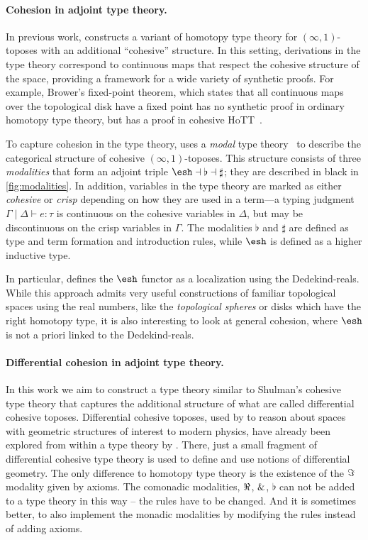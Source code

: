\documentclass{article}
\begin{document}
\paragraph{Cohesion in adjoint type theory.}

In previous work, \citet{Shulman2015} constructs a variant of homotopy type
theory for $(\infty,1)$-toposes with an additional ``cohesive'' structure. In
this setting, derivations in the type theory correspond to continuous maps that
respect the cohesive structure of the space, providing a framework for a wide
variety of synthetic proofs. For example, Brower's fixed-point theorem, which
states that all continuous maps over the topological disk have a fixed point has
no synthetic proof in ordinary homotopy type theory, but has a proof in cohesive
HoTT~\citep{Shulman2015}.


To capture cohesion in the type theory, \citet{Shulman2015} uses a \emph{modal}
type theory~\citep{Pfenning2001} to describe the categorical structure of
cohesive $(\infty,1)$-toposes. This structure consists of three
\emph{modalities}  that form an adjoint triple
$\shape \dashv \flat \dashv \sharp$; they are described in black in
\cref{fig:modalities}. In addition, variables in the type theory are marked as
either \emph{cohesive} or \emph{crisp} depending on how they are used in a
term---a typing judgment $\Gamma \mid \Delta \vdash e : \tau$ is continuous on
the cohesive variables in $\Delta$, but may be discontinuous on the crisp
variables in $\Gamma$. The modalities $\flat$ and $\sharp$ are defined as type
and term formation and introduction rules, while $\shape$ is defined as a higher
inductive type.

In particular, \citeauthor{Shulman2015} defines the $\shape$ functor as a
localization using the Dedekind-reals. While this approach admits very
useful constructions of familiar topological spaces using the real numbers, like
the \emph{topological spheres} or disks which have the right homotopy type, it
is also interesting to look at general cohesion, where $\shape$ is not a priori
linked to the Dedekind-reals.


\paragraph{Differential cohesion in adjoint type theory.}

In this work we aim to construct a type theory similar to Shulman's cohesive
type theory that captures the additional structure of what are called
differential cohesive toposes. Differential cohesive toposes, used by
\citet{Schreiber2013} to reason about spaces with geometric structures of
interest to modern physics, have already been explored from within a type theory
by \citet{Wellen2017}. There, just a small fragment of differential cohesive
type theory is used to define and use notions of differential geometry. The only
difference to homotopy type theory is the existence of the $\Im$ modality
given by axioms. The comonadic modalities, $\Re$, $\&$, $\flat$ can not be
added to a type theory in this way -- the rules have to be changed. And it is
sometimes better, to also implement the monadic modalities by modifying the
rules instead of adding axioms.
\end{document}
